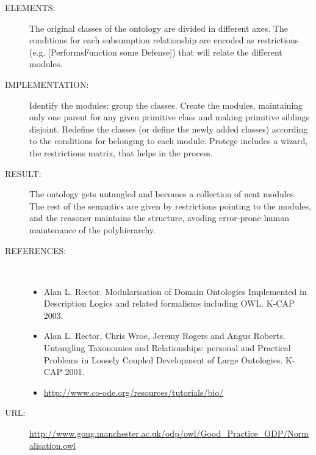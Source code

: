 \begin{description}
\item [ELEMENTS:] The original classes of the ontology are divided in different axes. The conditions for each subsumption relationship are encoded as restrictions (e.g. [PerformsFunction some Defense]) that will relate the different modules.

\item [IMPLEMENTATION:] Identify the modules: group the classes. Create the modules, maintaining only one parent for any given primitive class and making primitive siblings disjoint. Redefine the classes (or define the newly added classes) according to the conditions for belonging to each module. Protege includes a wizard, the restrictions matrix, that helps in the process.

\item [RESULT:] The ontology gets untangled and becomes a collection of neat modules. The rest of the semantics are given by restrictions pointing to the modules, and the reasoner maintains the structure, avoding error-prone human maintenance of the polyhierarchy.

\item [REFERENCES: ] ~\begin{itemize}
\item Alan L. Rector. Modularisation of Domain Ontologies Implemented in Description Logics and related formalisms including OWL. K-CAP 2003.
\item Alan L. Rector, Chris Wroe, Jeremy Rogers and Angus Roberts. Untangling Taxonomies and Relationships: personal and Practical Problems in Loosely Coupled Development of Large Ontologies. K-CAP 2001.
\item \url{http://www.co-ode.org/resources/tutorials/bio/}\end{itemize}
\item [URL: ] \url{http://www.gong.manchester.ac.uk/odp/owl/Good_Practice_ODP/Normalisation.owl} \end{description}